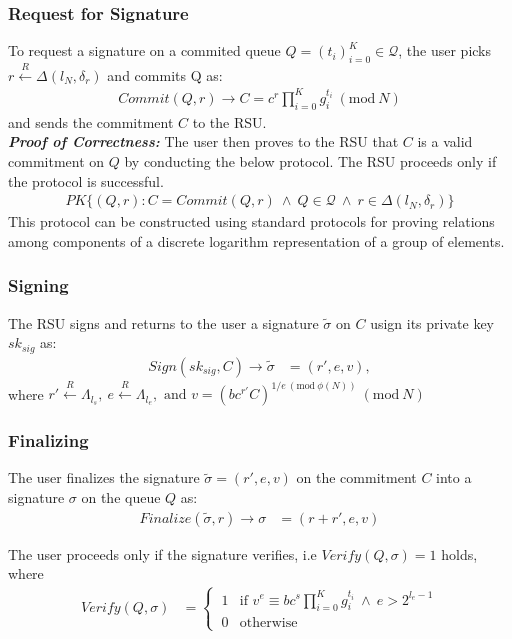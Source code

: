 \documentclass[12pt]{article}
\newcommand{\rIn}{\xleftarrow{R}}
\newcommand{\PK}[2]{\ensuremath{PK\{(#1): #2\}}}
\newcommand{\Mod}[1]{\ (\mathrm{mod}\ #1)}
\begin{document}
\subsubsection*{Request for Signature}
To request a signature on a commited queue $Q = (t_i)_{i=0}^K \in \mathcal{Q}$, the user picks $r \rIn \Delta(l_N, \delta_r)$ and commits Q as:
\begin{align} \label{eq:commit}
	Commit(Q,r) \rightarrow C = c^r \prod_{i=0}^K g_i^{t_i} \Mod{N}   
\end{align}
and sends the commitment $C$ to the RSU.\\

\textbf{\textit{Proof of Correctness:}} The user then proves to the RSU that $C$ is a valid commitment on $Q$ by conducting the below protocol. The RSU proceeds only if the protocol is successful.
\begin{align} \label{eq:commit_zkpok}
	\PK{Q, r}{C = Commit(Q, r)\ \land\ Q \in \mathcal{Q} \ \land\ r \in \Delta(l_N, \delta_r)}
\end{align}
This protocol can be constructed using standard protocols for proving relations among components of a discrete logarithm representation of a group of elements.

\subsubsection*{Signing}
The RSU signs and returns to the user a signature $\tilde{\sigma}$ on $C$ usign its private key $sk_{sig}$ as:
\begin{align} 
	Sign(sk_{sig}, C) \rightarrow \tilde{\sigma} &= (r', e, v), 
\end{align}
where $r' \rIn \Lambda_{l_s} , \ e \rIn \Lambda_{l_e}, \text{ and } v = (bc^{r'}C)^{1/e \Mod{\phi(N)}} \Mod{N}$

\subsubsection*{Finalizing}
The user finalizes the signature $\tilde{\sigma} = (r', e, v)$ on the commitment $C$ into a signature $\sigma$ on the queue $Q$ as:
\begin{align} 
	Finalize(\tilde{\sigma}, r) \rightarrow \sigma &= (r+r', e, v)
\end{align}

The user proceeds only if the signature verifies, i.e $Verify(Q, \sigma) = 1$ holds, where
\begin{align} 
	Verify(Q, \sigma) &= \begin{cases} 
		\ 1 & \text{if } v^e \equiv bc^s \prod_{i=0}^K g_i^{t_i} \ \land\ e > 2^{l_e - 1}\\ 
		\ 0 & \text{otherwise} 
	\end{cases}
\end{align}
\end{document}
